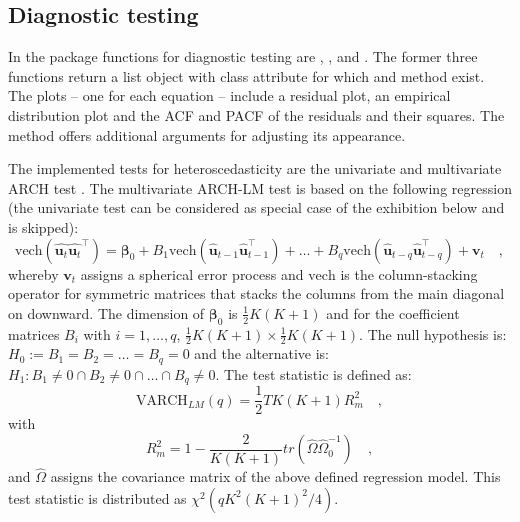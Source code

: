 \documentclass[nojss]{jss}
\begin{document}
\subsection{Diagnostic testing}
\label{subsec:diagtest}
In the package  functions for diagnostic testing are
, ,  and
. The former three functions return a list object
with class attribute  for which  and
 method exist. The plots -- one for each equation -- include a
residual plot, an empirical distribution plot and the ACF and PACF
of the residuals and their squares. The  method offers
additional arguments for adjusting its appearance.

The implemented tests for heteroscedasticity are the univariate and
multivariate ARCH test \citep[see][]{ENG1982, HAM1994, LUE2006}. The
multivariate ARCH-LM test is based on the following regression (the
univariate test can be considered as special case of the exhibition
below and is skipped): 
\begin{equation}
\mathrm{vech}(\hat{\mathbf{u}_t}\hat{\mathbf{u}_t}^\top) = \bm{\beta}_0 + B_1 \mathrm{vech}(\hat{\mathbf{u}}_{t-1}\hat{\mathbf{u}}_{t-1}^\top) + \ldots + B_q \mathrm{vech}(\hat{\mathbf{u}}_{t-q}\hat{\mathbf{u}}_{t-q}^\top) + \mathbf{v}_t \quad , 
\end{equation}
whereby $\mathbf{v}_t$ assigns a spherical error process and $\mathrm{vech}$ is
the column-stacking operator for symmetric matrices that stacks the
columns from the main diagonal on downward. The dimension of
$\bm{\beta}_0$ is $\frac{1}{2}K(K +1)$ and for the coefficient
matrices $B_i$ with $i=1, \ldots, q$, $\frac{1}{2}K(K +1) \times
\frac{1}{2}K(K +1)$. The null hypothesis is: $H_0 := B_1 = B_2 =
\ldots = B_q = 0$ and the alternative is: $H_1: B_1 \neq 0 \cap B_2
\neq 0 \cap \ldots \cap B_q \neq 0$. The test statistic is defined as: 
\begin{equation}
\text{VARCH}_\mathit{LM}(q) = \frac{1}{2}T K (K + 1)R_m^2 \quad ,
\end{equation}
with
\begin{equation}
R_m^2 = 1 - \frac{2}{K(K+1)}tr(\hat{\Omega} \hat{\Omega}_0^{-1}) \quad ,
\end{equation}
and $\hat{\Omega}$ assigns the covariance matrix of the above defined
regression model. This test statistic is distributed as
$\chi^2(qK^2(K+1)^2/4)$.
 
\end{document}
